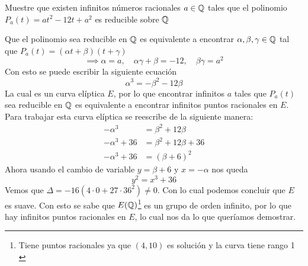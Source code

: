 \begin{prob}[10 pts.]
	Muestre que existen infinitos números racionales $a\in\mathbb{Q}$ tales que el polinomio $P_a(t)=at^2-12t+a^2$ es reducible sobre $\mathbb{Q}$
\end{prob}

\begin{sol}
	Que el polinomio sea reducible en $\mathbb{Q}$ es equivalente a encontrar $\alpha,\beta,\gamma\in\mathbb{Q}$ tal que $P_a(t)=(\alpha t+\beta)(t+\gamma)$
	\[
		\implies \alpha = a,\quad \alpha\gamma+\beta=-12,\quad \beta\gamma=a^2
	\]
	Con esto se puede escribir la siguiente ecuación
	\[
		\alpha^3=-\beta^2-12\beta
	\]
	La cual es un curva elíptica $E$, por lo que encontrar infinitos $a$ tales que $P_a(t)$ sea reducible en $\mathbb{Q}$ es equivalente a encontrar infinitos puntos racionales en $E$.\\
	Para trabajar esta curva elíptica se reescribe de la siguiente manera:
	\begin{align*}
		-\alpha^3    & =\beta^2+12\beta    \\
		-\alpha^3+36 & =\beta^2+12\beta+36 \\
		-\alpha^3+36 & =(\beta+6)^2
	\end{align*}
	Ahora usando el cambio de variable $y=\beta+6$ y $x=-\alpha$ nos queda
	\[
		y^2=x^3+36
	\]
	Vemos que $\Delta=-16(4\cdot 0+27\cdot36^2)\neq0$. Con lo cual podemos concluir que $E$ es suave. Con esto se sabe que $E(\mathbb{Q})$\footnote{Tiene puntos racionales ya que $(4,10)$ es solución y la curva tiene rango 1 \citep{prog}} es un grupo de orden infinito, por lo que hay infinitos puntos racionales en $E$, lo cual nos da lo que queríamos demostrar.
\end{sol}




